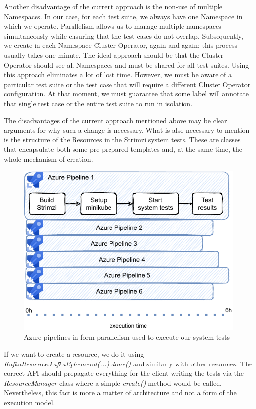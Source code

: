 Another disadvantage of the current approach is the non-use of multiple Namespaces. In our case, for each test suite, we always have one Namespace in which we operate. Parallelism allows us to manage multiple namespaces simultaneously while ensuring that the test cases do not overlap. Subsequently, we create in each Namespace Cluster Operator, again and again; this process usually takes one minute. The ideal approach should be that the Cluster Operator should see all Namespaces and must be shared for all test suites. Using this approach eliminates a lot of lost time. However, we must be aware of a particular test suite or the test case that will require a different Cluster Operator configuration. At that moment, we must guarantee that some label will annotate that single test case or the entire test suite to run in isolation.

The disadvantages of the current approach mentioned above may be clear arguments for why such a change is necessary. What is also necessary to mention is the structure of the Resources in the Strimzi system tests. These are classes that encapsulate both some pre-prepared templates and, at the same time, the whole mechanism of creation. 
\begin{figure}[!ht]
    \centering
    \includegraphics[scale=0.8]{obrazky-figures/06-proposal-of-parallel-approach/01a-azure_pipelines_with_test_results.pdf}
    \caption{Azure pipelines in form parallelism used to execute our system tests}
    \label{05:fig:azurepiplines}
\end{figure}
If we want to create a resource, we do it using \emph{KafkaResource.kafkaEphemeral(...).done()} and similarly with other resources. The correct API should propagate everything for the client writing the tests via the \emph{ResourceManager} class where a simple \emph{create()} method would be called. Nevertheless, this fact is more a matter of architecture and not a form of the execution model.

